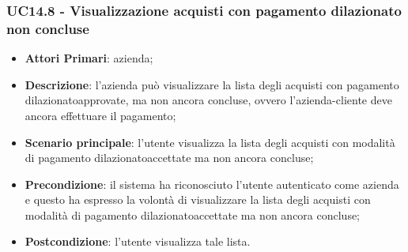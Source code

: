 \subsubsection{UC14.8 - Visualizzazione acquisti con pagamento dilazionato non concluse}
\begin{itemize}
	\item \textbf{Attori Primari}: azienda;
	\item \textbf{Descrizione}: l'azienda può visualizzare la lista degli acquisti con pagamento dilazionato\glosp approvate, ma non ancora concluse, ovvero l'azienda-cliente deve ancora effettuare il pagamento;
	\item \textbf{Scenario principale}: l'utente visualizza la lista degli acquisti con modalità di pagamento dilazionato\glosp accettate ma non ancora concluse;
	\item \textbf{Precondizione}: il sistema ha riconosciuto l'utente autenticato come azienda e questo ha espresso la volontà di visualizzare la lista degli acquisti con modalità di pagamento dilazionato\glosp accettate ma non ancora concluse;
	\item \textbf{Postcondizione}: l'utente visualizza tale lista.
\end{itemize}
